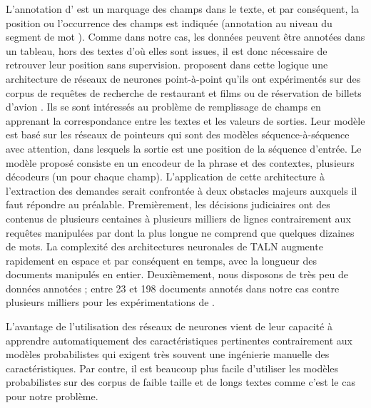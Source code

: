 L'annotation d'\citet{ace2005event} est un marquage des champs dans le texte, et par conséquent, la position ou l'occurrence des champs est indiquée (\og annotation au niveau du segment de mot \fg{}). Comme dans notre cas, les données peuvent être annotées dans un tableau, hors des textes d'où elles sont issues, il est donc nécessaire de retrouver leur position sans supervision. \citet{palm2017e2e-dnn} proposent dans cette logique une architecture de réseaux de neurones point-à-point qu'ils ont expérimentés sur des corpus de requêtes de recherche de restaurant et films \citep{liu2013mitmovierestaurant} ou de réservation de billets d'avion \citep{price1990atis}. Ils se sont intéressés au problème de remplissage de champs en apprenant la correspondance entre les textes et les valeurs de sorties. Leur modèle est basé sur les réseaux de pointeurs \citep{vinyals2015pointernetworks} qui sont des modèles séquence-à-séquence avec attention, dans lesquels la sortie est une position de la séquence d'entrée. Le modèle proposé consiste en un encodeur de la phrase et des contextes, plusieurs décodeurs (un pour chaque champ). L'application de cette architecture à l'extraction des demandes serait confrontée à deux obstacles majeurs auxquels il faut répondre au préalable. Premièrement, les décisions judiciaires ont des contenus de plusieurs centaines à plusieurs milliers de lignes contrairement aux requêtes manipulées par \citet{palm2017e2e-dnn}  dont la plus longue ne comprend que quelques dizaines de mots. La complexité des architectures neuronales de TALN augmente rapidement en espace et par conséquent en temps, avec la longueur des documents manipulés en entier. Deuxièmement, nous disposons de très peu de données annotées ; entre 23 et 198 documents annotés dans notre cas contre plusieurs milliers pour les expérimentations de \citet{palm2017e2e-dnn}.

L'avantage de l'utilisation des réseaux de neurones vient de leur capacité à apprendre automatiquement des caractéristiques pertinentes contrairement aux modèles probabilistes qui exigent très souvent une ingénierie manuelle des caractéristiques. Par contre, il est beaucoup plus facile d'utiliser les modèles probabilistes sur des corpus de faible taille et de longs textes comme c'est le cas pour notre problème.


